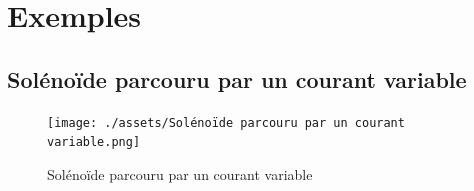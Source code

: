


\newpage
\section{Exemples} %
\label{sec:Exemples}

\subsection{Solénoïde parcouru par un courant variable} %
\label{sub:Solénoïde parcouru par un courant variable}

\begin{figure}[H] %
  \centering
  \texttt{[image: ./assets/Solénoïde parcouru par un courant variable.png]}
  \caption{Solénoïde parcouru par un courant variable}
  \label{fig:Solénoïde parcouru par un courant variable}
\end{figure}


